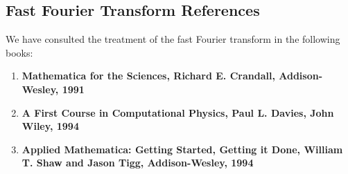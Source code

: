 \documentclass[11pt]{article}
\begin{document}
\subsection{Fast Fourier Transform References}
We have consulted the treatment of the fast Fourier transform in the following
  books:
\begin{enumerate}
\item \textbf{Mathematica for the Sciences, Richard E. Crandall, Addison-Wesley, 1991}
\item \textbf{A First Course in Computational Physics, Paul L. Davies, John Wiley, 1994}
\item \textbf{Applied Mathematica: Getting Started, Getting it Done, William T. Shaw and
  Jason Tigg, Addison-Wesley, 1994}
\end{enumerate}
\end{document}

